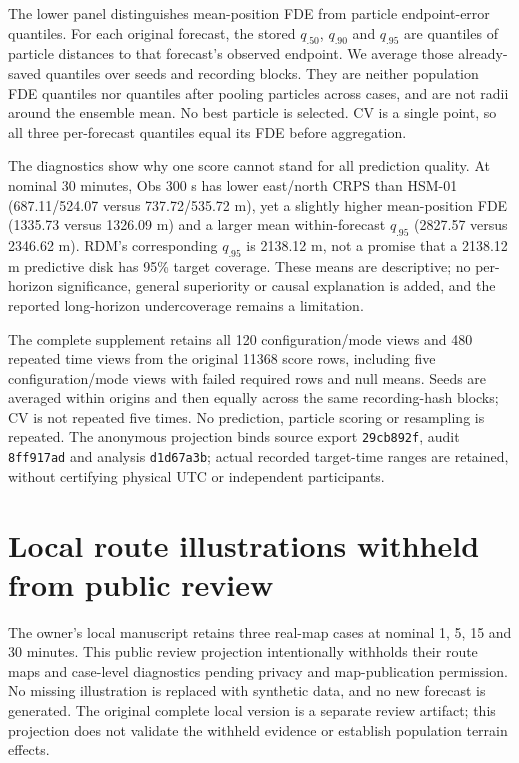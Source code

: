 The lower panel distinguishes mean-position FDE from particle endpoint-error
quantiles. For each original forecast, the stored $q_{.50}$, $q_{.90}$ and
$q_{.95}$ are quantiles of particle distances to that forecast's observed
endpoint. We average those already-saved quantiles over seeds and recording
blocks. They are neither population FDE quantiles nor quantiles after pooling
particles across cases, and are not radii around the ensemble mean. No best
particle is selected. CV is a single point, so all three per-forecast
quantiles equal its FDE before aggregation.

The diagnostics show why one score cannot stand for all prediction quality.
At nominal 30 minutes, Obs 300 s has lower east/north CRPS than HSM-01
(687.11/524.07 versus 737.72/535.72 m), yet a slightly higher mean-position
FDE (1335.73 versus 1326.09 m) and a larger mean within-forecast $q_{.95}$
(2827.57 versus 2346.62 m). RDM's corresponding $q_{.95}$ is 2138.12 m,
not a promise that a 2138.12 m predictive disk has 95\% target coverage.
These means are descriptive; no per-horizon significance, general superiority
or causal explanation is added, and the reported long-horizon undercoverage
remains a limitation.

The complete  supplement retains all
120 configuration/mode views and 480 repeated time views from the original
11368 score rows, including five configuration/mode views with failed required
rows and null means. Seeds are averaged within origins and then equally
across the same recording-hash blocks; CV is not repeated five times.
No prediction, particle scoring or resampling is repeated. The anonymous
projection binds source export \texttt{29cb892f}, audit \texttt{8ff917ad} and
analysis \texttt{d1d67a3b}; actual recorded target-time ranges are retained,
without certifying physical UTC or independent participants.



\section{Local route illustrations withheld from public review}
\label{sec:case-horizons}\hypertarget{sec:case-horizons}{}
The owner's local manuscript retains three real-map cases at nominal
1, 5, 15 and 30 minutes. This public review projection intentionally
withholds their route maps and case-level diagnostics pending privacy and
map-publication permission. No missing illustration is replaced with
synthetic data, and no new forecast is generated. The original complete
local version is a separate review artifact; this projection does not
validate the withheld evidence or establish population terrain effects.

